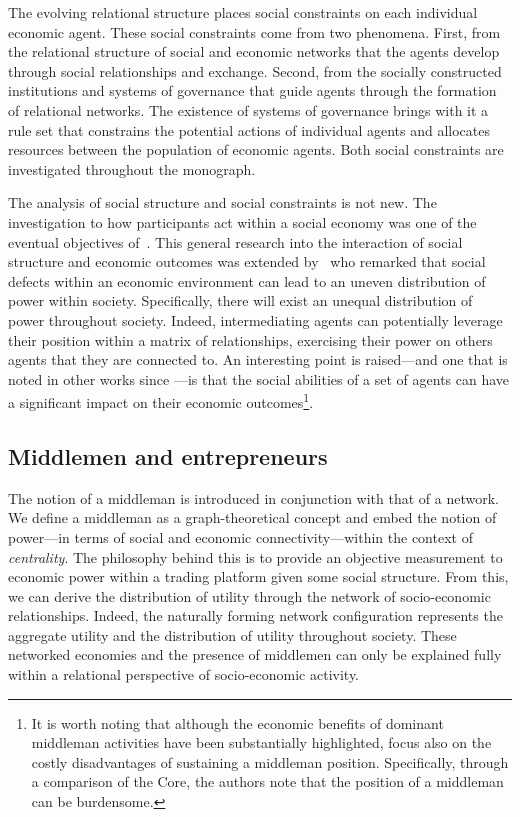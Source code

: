 The evolving relational structure places social constraints on each individual economic agent. These social constraints come from two phenomena. First, from the relational structure of social and economic networks that the agents develop through social relationships and exchange. Second, from the socially constructed institutions and systems of governance that guide agents through the formation of relational networks. The existence of systems of governance brings with it a rule set that constrains the potential actions of individual agents and allocates resources between the population of economic agents. Both social constraints are investigated throughout the monograph.

The analysis of social structure and social constraints is not new. The investigation to how participants act within a social economy was one of the eventual objectives of~\citet{vNM}. This general research into the interaction of social structure and economic outcomes was extended by~\citet{KalaiMiddlemen1978} who remarked that social defects within an economic environment can lead to an uneven distribution of power within society. Specifically, there will exist an unequal distribution of power throughout society. Indeed, intermediating agents can potentially leverage their position within a matrix of relationships, exercising their power on others agents that they are connected to. An interesting point is raised---and one that is noted in other works since \citet{Granovetter2005}---is that the social abilities of a set of agents can have a significant impact on their economic outcomes\footnote{It is worth noting that although the economic benefits of dominant middleman activities have been substantially highlighted, \citet{KalaiMiddlemen1978} focus also on the costly disadvantages of sustaining a middleman position. Specifically, through a comparison of the Core, the authors note that the position of a middleman can be burdensome.}.

\subsection{Middlemen and entrepreneurs}

The notion of a middleman is introduced in conjunction with that of a network. We define a middleman as a graph-theoretical concept and embed the notion of power---in terms of social and economic connectivity---within the context of \emph{centrality}. The philosophy behind this is to provide an objective measurement to economic power within a trading platform given some social structure. From this, we can derive the distribution of utility through the network of socio-economic relationships. Indeed, the naturally forming network configuration represents the aggregate utility and the distribution of utility throughout society. These networked economies and the presence of middlemen can only be explained fully within a relational perspective of socio-economic activity.

